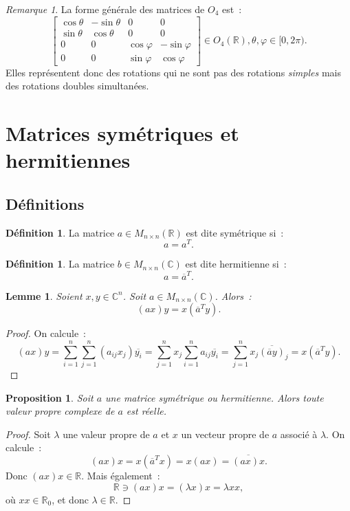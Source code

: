 \documentclass{article}
\newcommand{\R}{\mathbb R}
\newcommand{\C}{\mathbb C}
\newcommand{\M}[3]{M_{#1 \times #2}(#3)}
\newcommand{\conj}[1]{\overline {#1}}
\newtheorem{prp}[thm]{Proposition}
\newtheorem{lem}[thm]{Lemme}
\theoremstyle{definition}
\newtheorem{déf}[thm]{Définition}
\theoremstyle{remark}
\newtheorem*{rmq}{Remarque}
\begin{document}
		\begin{rmq} La forme générale des matrices de $O_4$ est~:
		\[\begin{bmatrix}
			\cos \theta & -\sin \theta &       0      &        0 \\
			\sin \theta &  \cos \theta &       0      &        0 \\
			     0      &      0       & \cos \varphi & -\sin \varphi \\
			     0      &      0       & \sin \varphi &  \cos \varphi
		\end{bmatrix} \in O_4(\R), \theta, \varphi \in [0, 2\pi).\]
		Elles représentent donc des rotations qui ne sont pas des rotations \emph{simples} mais des rotations doubles simultanées.
		\end{rmq}

\newpage
\section{Matrices symétriques et hermitiennes}
	\subsection{Définitions}
		\begin{déf} La matrice $a \in \M nn\R$ est dite symétrique si~:
		\[a = a^T.\]
		\end{déf}

		\begin{déf} La matrice $b \in \M nn\C$ est dite hermitienne si~:
		\[a = \conj a^T.\]
		\end{déf}

		\begin{lem} Soient $x, y \in \C^n$. Soit $a \in \M nn\C$. Alors~:
		\[(ax)y = x(\conj a^Ty).\]
		\end{lem}

		\begin{proof} On calcule~:
		\[(ax)y = \sum_{i=1}^n\sum_{j=1}^n\left(a_{ij}x_j\right)\conj {y_i} = \sum_{j=1}^nx_j\sum_{i=1}^na_{ij}\conj {y_i}
		= \sum_{j=1}^nx_j\conj {(\conj ay)}_j = x(\conj a^Ty).\]
		\end{proof}

		\begin{prp} Soit $a$ une matrice symétrique ou hermitienne. Alors toute valeur propre complexe de $a$ est réelle.
		\end{prp}

		\begin{proof} Soit $\lambda$ une valeur propre de $a$ et $x$ un vecteur propre de $a$ associé à $\lambda$. On calcule~:
		\[(ax)x = x(\conj a^Tx) = x(ax) = \conj {(ax)x}.\]
		Donc $(ax)x \in \R$. Mais également~:
		\[\R \ni (ax)x = (\lambda x)x = \lambda xx,\]
		où $xx \in \R_0$, et donc $\lambda \in\R$.
		\end{proof}
\end{document}
